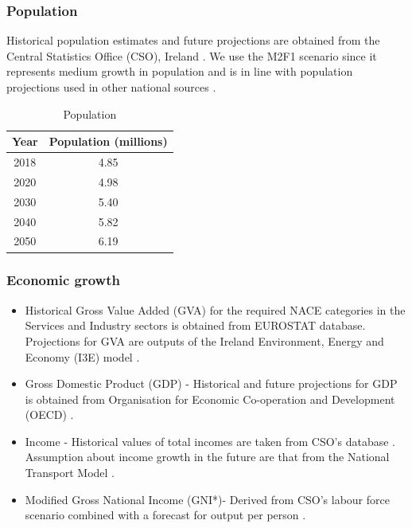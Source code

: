 \documentclass[gmd,manuscript]{copernicus}
\begin{document}
\subsubsection{Population}
Historical population estimates and future projections are obtained from the Central Statistics Office (CSO), Ireland \citep{CentralStatisticsOffice2020}. We use the M2F1 scenario since it represents medium growth in population and is in line with population projections used in other national sources \citep{Yakut2020}.

\begin{table}[htbp]
 \centering
 \footnotesize
 \caption{Population}
 \begin{tabular}{cc}
 \hline
 Year & Population (millions) \\
 \hline
 2018 & 4.85 \\
 2020 & 4.98 \\
 2030 & 5.40 \\
 2040 & 5.82 \\
 2050 & 6.19 \\
 \hline
 \end{tabular}%
 \label{tab:pop}%
\end{table}%


\subsubsection{Economic growth}
\begin{itemize}
 \item Historical Gross Value Added (GVA) for the required NACE categories in the Services and Industry sectors is obtained from EUROSTAT database. Projections for GVA are outputs of the Ireland Environment, Energy and Economy (I3E) model \citep{Yakut2020}.
 \item Gross Domestic Product (GDP) - Historical and future projections for GDP is obtained from Organisation for Economic Co-operation and Development (OECD) \citep{OECD2018}. 
 \item Income - Historical values of total incomes are taken from CSO's database \citep{CSOincome}. Assumption about income growth in the future are that from the National Transport Model \citep{AECOMIrelandLimited2019}. 
 \item Modified Gross National Income (GNI*)- Derived from CSO's labour force scenario combined with a forecast for output per person \citep{cso_lf}. 
\end{itemize}
\end{document}
